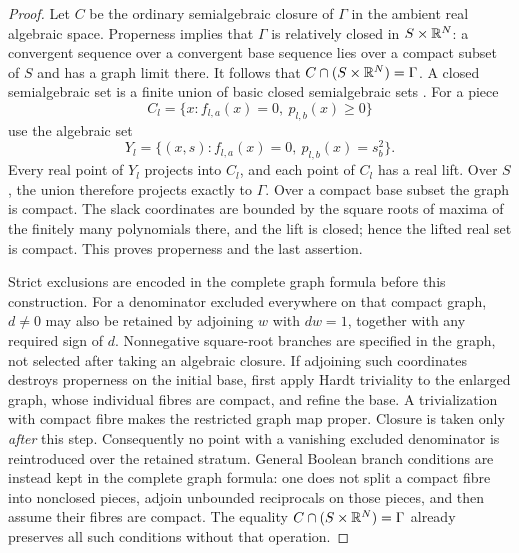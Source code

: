 \begin{proof}
Let $C$ be the ordinary semialgebraic closure of $\Gamma$ in the ambient
real algebraic space. Properness implies that $\Gamma$ is relatively
closed in $S\times\mathbb R^N$: a convergent sequence over a convergent base
sequence lies over a compact subset of $S$ and has a graph limit there.
It follows that $C\cap(S\times\mathbb R^N)=\Gamma$. A closed semialgebraic
set is a finite union of basic closed semialgebraic sets
\cite[Theorem 2.7.2]{BCR98}. For a piece
\[
 C_l=\{x:f_{l,a}(x)=0,\ p_{l,b}(x)\ge0\}
\]
use the algebraic set
\[
 Y_l=\{(x,s): f_{l,a}(x)=0,\ p_{l,b}(x)=s_b^2\}.
\]
Every real point of $Y_l$ projects into $C_l$, and each point of $C_l$
has a real lift. Over $S$, the union therefore projects exactly to
$\Gamma$. Over a compact base subset the graph is compact. The slack
coordinates are bounded by the square roots of maxima of the finitely
many polynomials there, and the lift is closed; hence the lifted real
set is compact. This proves properness and the last assertion.

Strict exclusions are encoded in the complete graph formula before this
construction. For a denominator excluded everywhere on that compact graph,
$d\ne0$ may also be retained by adjoining $w$ with $dw=1$, together
with any required sign of $d$. Nonnegative square-root branches are
specified in the graph, not selected after taking an algebraic closure.
If adjoining such coordinates destroys properness on the initial base,
first apply Hardt triviality to the enlarged graph, whose individual
fibres are compact, and refine the base. A trivialization with compact
fibre makes the restricted graph map proper. Closure is taken only
\emph{after} this step. Consequently no point with a vanishing excluded
denominator is reintroduced over the retained stratum. General Boolean
branch conditions are instead kept in the complete graph formula: one
does not split a compact fibre into nonclosed pieces, adjoin unbounded
reciprocals on those pieces, and then assume their fibres are compact.
The equality $C\cap(S\times\mathbb R^N)=\Gamma$ already preserves all such
conditions without that operation.
\end{proof}

